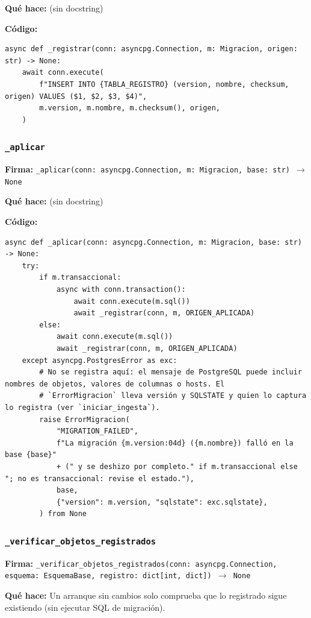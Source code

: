 \documentclass[11pt,a4paper]{article}
\begin{document}
\textbf{Qué hace:} (sin docstring)

\textbf{Código:}
\begin{lstlisting}
async def _registrar(conn: asyncpg.Connection, m: Migracion, origen: str) -> None:
    await conn.execute(
        f"INSERT INTO {TABLA_REGISTRO} (version, nombre, checksum, origen) VALUES ($1, $2, $3, $4)",
        m.version, m.nombre, m.checksum(), origen,
    )
\end{lstlisting}

\subsubsection*{\texttt{\_aplicar}}
\textbf{Firma:} \texttt{\_aplicar(conn: asyncpg.Connection, m: Migracion, base: str) $\rightarrow$ None}

\textbf{Qué hace:} (sin docstring)

\textbf{Código:}
\begin{lstlisting}
async def _aplicar(conn: asyncpg.Connection, m: Migracion, base: str) -> None:
    try:
        if m.transaccional:
            async with conn.transaction():
                await conn.execute(m.sql())
                await _registrar(conn, m, ORIGEN_APLICADA)
        else:
            await conn.execute(m.sql())
            await _registrar(conn, m, ORIGEN_APLICADA)
    except asyncpg.PostgresError as exc:
        # No se registra aquí: el mensaje de PostgreSQL puede incluir nombres de objetos, valores de columnas o hosts. El
        # `ErrorMigracion` lleva versión y SQLSTATE y quien lo captura lo registra (ver `iniciar_ingesta`).
        raise ErrorMigracion(
            "MIGRATION_FAILED",
            f"La migración {m.version:04d} ({m.nombre}) falló en la base {base}"
            + (" y se deshizo por completo." if m.transaccional else "; no es transaccional: revise el estado."),
            base,
            {"version": m.version, "sqlstate": exc.sqlstate},
        ) from None
\end{lstlisting}

\subsubsection*{\texttt{\_verificar\_objetos\_registrados}}
\textbf{Firma:} \texttt{\_verificar\_objetos\_registrados(conn: asyncpg.Connection, esquema: EsquemaBase, registro: dict[int, dict]) $\rightarrow$ None}

\textbf{Qué hace:} Un arranque sin cambios solo comprueba que lo registrado sigue existiendo (sin ejecutar SQL de migración).
\end{document}
